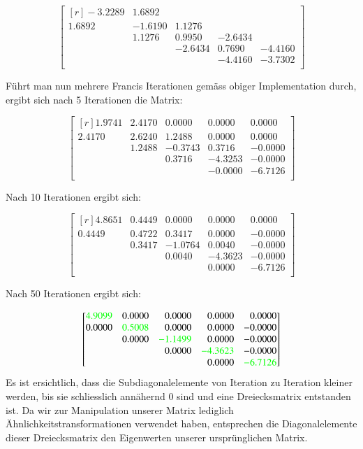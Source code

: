 \begin{equation}
\begin{bmatrix*}[r]
-3.2289 &	1.6892 &	 &	 &	\\
1.6892 &	-1.6190 & 1.1276 &  &	\\
 &	1.1276&	0.9950 &	-2.6434 &	\\
 &	 &	-2.6434 &	0.7690 &	-4.4160\\
 &	 &		& -4.4160 & -3.7302\\
\end{bmatrix*}
\end{equation}

Führt man nun mehrere Francis Iterationen gemäss obiger Implementation durch, ergibt sich nach 5 Iterationen die Matrix:

\begin{equation}
\begin{bmatrix*}[r]
1.9741 & 2.4170	& 0.0000 & 0.0000 & 0.0000\\
2.4170 & 2.6240 & 1.2488 & 0.0000 & 0.0000\\
 & 1.2488 & -0.3743 & 0.3716 & -0.0000\\
 &  & 0.3716 & -4.3253 & -0.0000\\
 &  &  &-0.0000 & -6.7126\\
\end{bmatrix*}
\end{equation}

Nach 10 Iterationen ergibt sich:

\begin{equation}
\begin{bmatrix*}[r]
4.8651 & 0.4449 & 0.0000 & 0.0000 & 0.0000\\
0.4449 & 0.4722 & 0.3417 & 0.0000 & -0.0000\\
 & 0.3417 &-1.0764 & 0.0040 & -0.0000\\
 &  & 0.0040 & -4.3623 & -0.0000\\
 &  &  & 0.0000 & -6.7126\\
\end{bmatrix*}
\end{equation}

Nach 50 Iterationen ergibt sich:

\begin{equation}
\begin{bmatrix*}[r]
\textcolor{green}{4.9099} & 0.0000	& 0.0000 & 0.0000 & 0.0000\\
0.0000 & \textcolor{green}{0.5008} & 0.0000 & 0.0000 & -0.0000\\
 & 0.0000 & \textcolor{green}{-1.1499} & 0.0000 & -0.0000\\
 &  & 0.0000 & \textcolor{green}{-4.3623} & -0.0000\\
 &  &  & 0.0000 &\textcolor{green}{-6.7126}\\
\end{bmatrix*}
\end{equation}
Es ist ersichtlich, dass die Subdiagonalelemente von Iteration zu Iteration kleiner werden, bis sie schliesslich annähernd 0 sind und eine Dreiecksmatrix entstanden ist.
Da wir zur Manipulation unserer Matrix lediglich Ähnlichkeitstransformationen verwendet haben, entsprechen die Diagonalelemente dieser Dreiecksmatrix den Eigenwerten unserer ursprünglichen Matrix.
